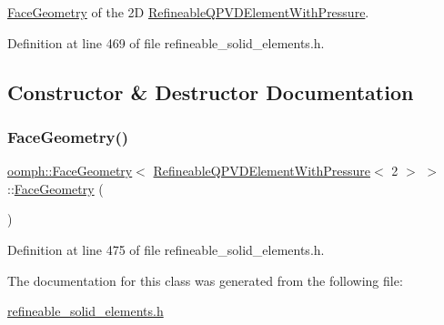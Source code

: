 \hyperlink{classoomph_1_1FaceGeometry}{Face\+Geometry} of the 2D \hyperlink{classoomph_1_1RefineableQPVDElementWithPressure}{Refineable\+Q\+P\+V\+D\+Element\+With\+Pressure}. 

Definition at line 469 of file refineable\+\_\+solid\+\_\+elements.\+h.



\subsection{Constructor \& Destructor Documentation}
\mbox{\label{classoomph_1_1FaceGeometry_3_01RefineableQPVDElementWithPressure_3_012_01_4_01_4_a98c44064e18ca082aa9da029de145dc7}} 
\subsubsection{\texorpdfstring{Face\+Geometry()}{FaceGeometry()}}
{\footnotesize\ttfamily \hyperlink{classoomph_1_1FaceGeometry}{oomph\+::\+Face\+Geometry}$<$ \hyperlink{classoomph_1_1RefineableQPVDElementWithPressure}{Refineable\+Q\+P\+V\+D\+Element\+With\+Pressure}$<$ 2 $>$ $>$\+::\hyperlink{classoomph_1_1FaceGeometry}{Face\+Geometry} (\begin{DoxyParamCaption}{ }\end{DoxyParamCaption})\hspace{0.3cm}{\ttfamily [inline]}}



Definition at line 475 of file refineable\+\_\+solid\+\_\+elements.\+h.



The documentation for this class was generated from the following file\+:\begin{DoxyCompactItemize}
\item 
\hyperlink{refineable__solid__elements_8h}{refineable\+\_\+solid\+\_\+elements.\+h}\end{DoxyCompactItemize}
